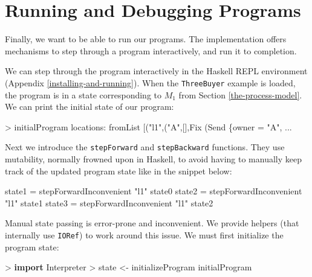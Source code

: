 \documentclass[runningheads,plain]{llncs}
\newenvironment{Shaded}{}{}
\newcommand{\KeywordTok}[1]{\textcolor[rgb]{0.00,0.44,0.13}{\textbf{#1}}}
\newcommand{\DataTypeTok}[1]{\textcolor[rgb]{0.56,0.13,0.00}{#1}}
\newcommand{\StringTok}[1]{\textcolor[rgb]{0.25,0.44,0.63}{#1}}
\newcommand{\OtherTok}[1]{\textcolor[rgb]{0.00,0.44,0.13}{#1}}
\newcommand{\FunctionTok}[1]{\textcolor[rgb]{0.02,0.16,0.49}{#1}}
\newcommand{\NormalTok}[1]{#1}
\begin{document}
\section{Running and Debugging Programs}\label{running-debugging}

Finally, we want to be able to run our programs. The implementation
offers mechanisms to step through a program interactively, and run it to
completion.

We can step through the program interactively in the Haskell REPL
environment (Appendix \ref{installing-and-running}). 
When the \texttt{ThreeBuyer} example is loaded, the program is in a state corresponding to $M_1$ from Section \ref{the-process-model}.
We can print the initial state of our program:

\begin{Shaded}
\begin{Highlighting}[]
\FunctionTok{>}\NormalTok{ initialProgram}
\NormalTok{locations}\FunctionTok{:}\NormalTok{ fromList [(}\StringTok{"l1"}\NormalTok{,(}\StringTok{"A"}\NormalTok{,[],}\DataTypeTok{Fix}\NormalTok{ (}\DataTypeTok{Send}\NormalTok{ \{owner }\FunctionTok{=} \StringTok{"A"}\NormalTok{, }\FunctionTok{...} 
\end{Highlighting}
\end{Shaded}

Next we introduce the \texttt{stepForward} and \texttt{stepBackward}
functions. They use mutability, normally frowned upon in Haskell, to
avoid having to manually keep track of the updated program state like in
the snippet below:

\begin{Shaded}
\begin{Highlighting}[]
\NormalTok{state1 }\FunctionTok{=}\NormalTok{ stepForwardInconvenient }\StringTok{"l1"}\NormalTok{ state0}
\NormalTok{state2 }\FunctionTok{=}\NormalTok{ stepForwardInconvenient }\StringTok{"l1"}\NormalTok{ state1}
\NormalTok{state3 }\FunctionTok{=}\NormalTok{ stepForwardInconvenient }\StringTok{"l1"}\NormalTok{ state2}
\end{Highlighting}
\end{Shaded}

Manual state passing is error-prone and inconvenient. We provide helpers
(that internally use \texttt{IORef}) to work around this issue. We must
first initialize the program state:

\begin{Shaded}
\begin{Highlighting}[]
\FunctionTok{>} \KeywordTok{import }\DataTypeTok{Interpreter}
\FunctionTok{>}\NormalTok{ state }\OtherTok{<-}\NormalTok{ initializeProgram initialProgram}
\end{Highlighting}
\end{Shaded}
\end{document}
